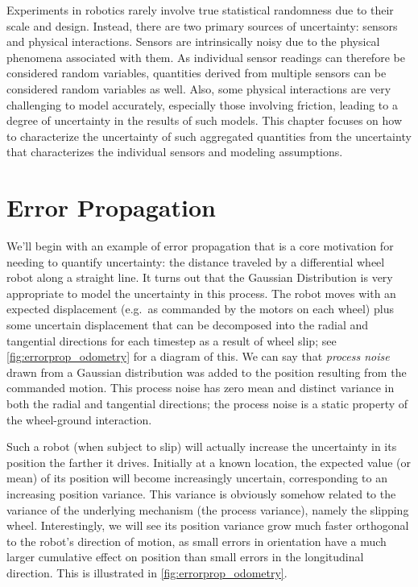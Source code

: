 Experiments in robotics rarely involve true statistical randomness due to their scale and design. Instead, there are two primary sources
of uncertainty: sensors and physical interactions. Sensors are intrinsically noisy due to the physical phenomena associated with them.
As individual sensor readings can therefore be considered random variables, quantities derived from multiple sensors can be considered random variables as well. Also, some physical interactions are very challenging to model accurately, especially those involving
friction, leading to a degree of uncertainty in the results of such models. This chapter focuses on how to characterize the uncertainty
of such aggregated quantities from the uncertainty that characterizes the individual sensors and modeling assumptions.

\section{Error Propagation}\label{sec:errorprop}
We'll begin with an example of error propagation that is a core motivation for needing to quantify uncertainty: the distance traveled by a
differential wheel robot along a straight line. It turns out that the Gaussian Distribution is very appropriate to model the uncertainty in this process. The robot moves with an expected displacement (e.g.\ as commanded by the motors on each wheel) plus some uncertain displacement that can be decomposed into the radial and tangential directions for each timestep as a result of wheel slip; see \cref{fig:errorprop_odometry} for a diagram of this. We can say that \textsl{process noise} drawn from a Gaussian distribution was added to the position resulting from the commanded motion. This process noise has zero mean and distinct variance in both the radial and tangential directions; the process noise is a static property of the wheel-ground interaction.

Such a robot (when subject to slip) will actually increase the uncertainty in its position the farther it drives. Initially at a known location, the expected value (or mean) of its position will become increasingly uncertain, corresponding to an increasing position variance. This variance is obviously somehow related to the variance of the underlying mechanism (the process variance), namely the slipping wheel. Interestingly, we will see its position variance grow much faster orthogonal to the robot's direction of motion, as small errors in orientation have a much larger cumulative effect on position than small errors in the longitudinal direction. This is illustrated in \cref{fig:errorprop_odometry}.


